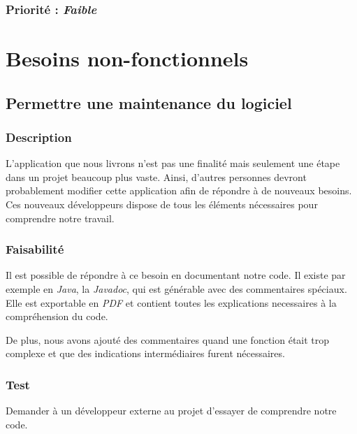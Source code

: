 \subsubsection{Priorité : \textit{Faible}}

\section{Besoins non-fonctionnels}\label{besoins_non-fonctionnels}

\subsection{Permettre une maintenance du logiciel}

\subsubsection{Description}

L’application que nous livrons n’est pas une finalité mais seulement une étape dans un projet beaucoup plus vaste. Ainsi, d’autres personnes devront probablement modifier cette application afin de répondre à de nouveaux besoins. Ces nouveaux développeurs dispose de tous les éléments nécessaires pour comprendre notre travail.                                                                                                                                                                                                                                                                                       
\subsubsection{Faisabilité}

Il est possible de répondre à ce besoin en documentant notre code. Il existe par exemple en \textit{Java}, la \textit{Javadoc}, qui est générable avec des commentaires spéciaux. Elle est exportable en \textit{PDF} et contient toutes les explications necessaires à la compréhension du code. 

De plus, nous avons ajouté des commentaires quand une fonction était trop complexe et que des indications intermédiaires furent nécessaires.

\subsubsection{Test}

Demander à un développeur externe au projet d’essayer de comprendre notre code.


